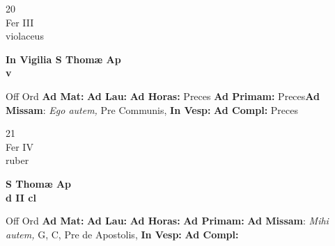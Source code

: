 \documentclass[10pt, openany]{book}
\begin{document}
    \begin{center}
        \begin{minipage}{3.5in}
            \vspace{2em}
            \begin{minipage}{0.5in}
                {\Huge 20} \\
                {\normalsize Fer III} \\
                {\normalsize violaceus}
            \end{minipage}
            \begin{minipage}{3.0in}
                \textbf{ \large In Vigilia S Thomæ Ap \\
                \textnormal{\normalsize v}} \\ 
            \end{minipage}
            \begin{justify}Off Ord
                \textbf{Ad Mat: }
                \textbf{Ad Lau: }
                \textbf{Ad Horas: }Preces
                \textbf{Ad Primam: }Preces\textbf{Ad Missam}: \textit{Ego autem,} Pre Communis,  
                \textbf{In Vesp: }
                \textbf{Ad Compl: }Preces
            \end{justify}
        \end{minipage}
    \end{center}

    \begin{center}
        \begin{minipage}{3.5in}
            \vspace{2em}
            \begin{minipage}{0.5in}
                {\Huge 21} \\
                {\normalsize Fer IV} \\
                {\normalsize ruber}
            \end{minipage}
            \begin{minipage}{3.0in}
                \textbf{ \large S Thomæ Ap \\
                \textnormal{\normalsize d II cl}} \\ 
            \end{minipage}
            \begin{justify}Off Ord
                \textbf{Ad Mat: }
                \textbf{Ad Lau: }
                \textbf{Ad Horas: }
                \textbf{Ad Primam: }\textbf{Ad Missam}: \textit{Mihi autem,} G, C, Pre de Apostolis,  
                \textbf{In Vesp: }
                \textbf{Ad Compl: }
            \end{justify}
        \end{minipage}
    \end{center}
\end{document}
